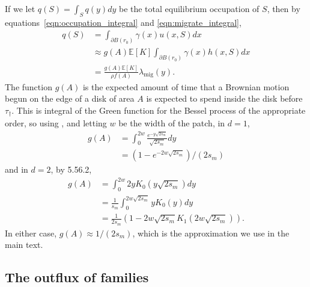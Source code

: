 \documentclass{article}
\newcommand{\citet}[1]{\cite{#1}}
\newcommand{\E}{\mathbb{E}}
\newcommand{\one}{\mathbf{1}}
\newcommand{\migrate}{\lambda_\text{mig}}
\begin{document}
If we let $q(S) = \int_S q(y) dy$ be the total equilibrium occupation of $S$,
then by equations~\eqref{eqn:occupation_integral} and \eqref{eqn:migrate_integral},
\begin{align}
    q(S)  &= \int_{\partial B(r_0)} \gamma(x) u(x,S) dx  \\
          &\approx g(A) \E[K] \int_{\partial B(r_0)} \gamma(x) h(x,S) dx \\
          &= \frac{ g(A) \E[K] }{ \rho f(A) } \migrate(y) . \label{eqn:q_migrate_relation}
\end{align}
The function $g(A)$ is the expected amount of time that a Brownian motion begun on the edge of a disk of area $A$
is expected to spend inside the disk before $\tau_\dagger$.
This is integral of the Green function for the Bessel process of the appropriate order, 
so using \citet{borodin2002handbook}, %
and letting $w$ be the width of the patch,
in $d=1$,
\begin{align}
    g(A) %
  &= \int_0^{2w} \frac{ e^{- y \sqrt{2s_m} }}{\sqrt{2s_m}} dy \\
  &= (1-e^{-2w\sqrt{2s_m}})/(2s_m)
\end{align}
and in $d=2$, by \citet{gradshteyn2007table} 5.56.2,
\begin{align}
    g(A) %
  &= \int_0^{2w} 2 y K_0(y \sqrt{2s_m}) dy \\
  &= \frac{1}{s_m}\int_0^{2w\sqrt{2s_m}} y K_0(y) dy \\
  &= \frac{1}{2s_m}\left(1- 2w\sqrt{2s_m} K_1(2w\sqrt{2s_m}) \right)  .
\end{align}
In either case, $g(A) \approx 1/(2s_m)$, which is the approximation we use in the main text.




\subsection[Outflux of Families]{The outflux of families}
\label{apx:outflux}
\end{document}
